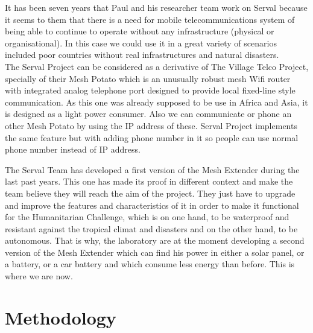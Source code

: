 \documentclass[a4paper, 11pt, oneside]{Thesis}  %
\begin{document}
It has been seven years that Paul and his researcher team work on Serval because it seems to them that there is a need for mobile telecommunications system of being able to continue to operate without any infrastructure (physical or organisational). In this case we could use it in a great variety of scenarios included poor countries without real infrastructures and natural disasters. \\
The Serval Project can be considered as a derivative of The Village Telco Project, specially of their Mesh Potato which is an unusually robust mesh Wifi router with integrated analog telephone port designed to provide local fixed-line style communication. As this one was already supposed to be use in Africa and Asia, it is designed as a light power consumer. Also we can communicate or phone an other Mesh Potato by using the IP address of these. Serval Project implements the same feature but with adding phone number in it so people can use normal phone number instead of IP address. \par
The Serval Team has developed a first version of the Mesh Extender during the last past years. This one has made its proof in different context and make the team believe they will reach the aim of the project. They just have to upgrade and improve the features and characteristics of it in order to make it functional for the Humanitarian Challenge, which is on one hand, to be waterproof and resistant against the tropical climat and disasters and on the other hand, to be autonomous. That is why, the laboratory are at the moment developing a second version of the Mesh Extender which can find his power in either a solar panel, or a battery, or a car battery and which consume less energy than before. This is where we are now.

\chapter{Methodology}
\end{document}
